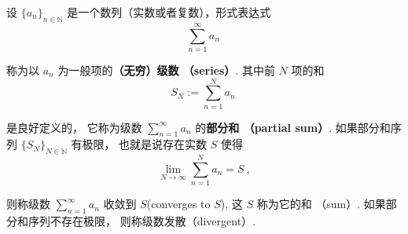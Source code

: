 


设 $\{a_n\}_{n\in\mathbb{N}}$ 是一个数列（实数或者复数），形式表达式
\begin{equation}
\sum_{n=1}^\infty a_n~
\end{equation}



称为以 $a_n$ 为一般项的\textbf{（无穷）级数 （series）}. 其中前 $N$ 项的和
\begin{equation}
S_N:=\sum_{n=1}^N a_n~
\end{equation}



是良好定义的， 它称为级数 $\sum_{n=1}^\infty a_n$ 的\textbf{部分和 （partial sum）}. 如果部分和序列 $\{S_N\}_{N\in\mathbb{N}}$ 有极限， 也就是说存在实数 $S$ 使得
\begin{equation}
\lim_{N\to\infty}\sum_{n=1}^N a_n=S~,
\end{equation}


则称级数 $\sum_{n=1}^\infty a_n$ 收敛到 $S$(converges to $S$), 这 $S$ 称为它的和 （sum）. 如果部分和序列不存在极限， 则称级数发散（divergent）. 

